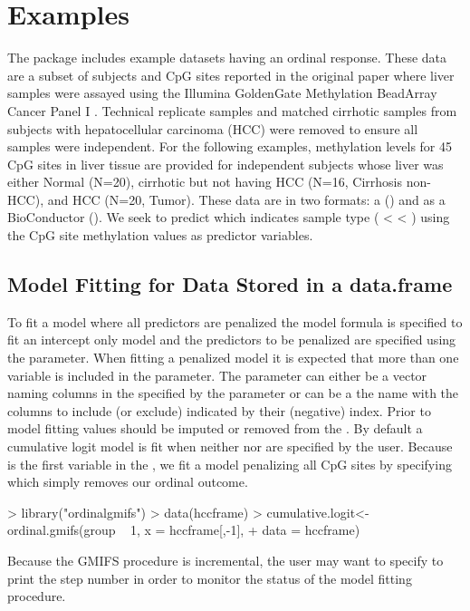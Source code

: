 \documentclass[article, shortclass, nojss]{jss}
\begin{document}
\section{Examples}
The  package includes example datasets having an ordinal response. These data are a subset of subjects and CpG sites reported in the original paper where liver samples were assayed using the Illumina GoldenGate Methylation BeadArray Cancer Panel I \cite{ArcherHCC}. Technical replicate samples and matched cirrhotic samples from subjects with hepatocellular carcinoma (HCC) were removed to ensure all samples were independent. For the following examples, methylation levels for 45 CpG sites in liver tissue are provided for independent subjects whose liver was either Normal (N=20), cirrhotic but not having HCC (N=16, Cirrhosis non-HCC), and HCC (N=20, Tumor). These data are in two formats: a  () and as a BioConductor  (). We seek to predict  which indicates sample type ( <  < ) using the CpG site methylation values as predictor variables. 
 
\subsection{Model Fitting for Data Stored in a data.frame}
To fit a model where all predictors are penalized the model formula is specified to fit an intercept only model and the predictors to be penalized are specified using the  parameter. When fitting a penalized model it is expected that more than one variable is included in the  parameter. The  parameter can either be a vector naming columns in the  specified by the  parameter or  can be a the  name with the columns to include (or exclude) indicated by their (negative) index. Prior to model fitting  values should be imputed or removed from the . By default a cumulative logit model is fit when neither  nor  are specified by the user. Because  is the first variable in the , we fit a model penalizing all CpG sites by specifying  which simply removes our ordinal outcome.
\begin{Schunk}
\begin{Sinput}
> library("ordinalgmifs")
> data(hccframe)
> cumulative.logit<-ordinal.gmifs(group ~ 1, x = hccframe[,-1], 
+ 	data = hccframe)
\end{Sinput}
\end{Schunk}
Because the GMIFS procedure is incremental, the user may want to specify  to print the step number in order to monitor the status of the model fitting procedure.
\end{document}
